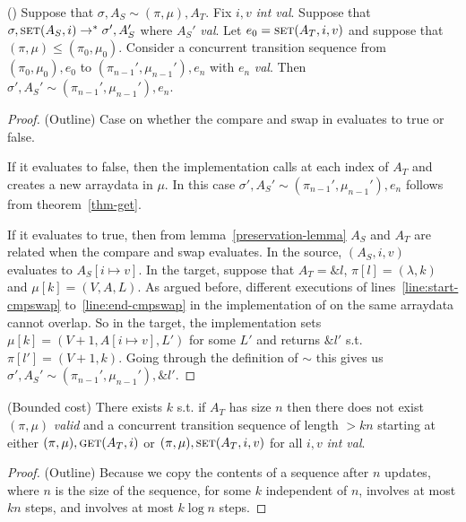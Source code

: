 \begin{theorem}
(\set{}) Suppose that $\sigma, A_S \sim (\pi,\mu), A_T$. Fix $i, v$ \emph{int val}. Suppose that $\sigma, \text{{\sc set}}{}(A_S, i) \to^* \sigma', A_S'$ where $A_S'$ \emph{val}. Let $e_0 = \text{{\sc set}}{}(A_T, i, v)$ and suppose that $(\pi, \mu) \leq (\pi_0, \mu_0)$. Consider a concurrent transition sequence from $(\pi_0, \mu_0), e_0$ to $(\pi_{n-1}', \mu_{n-1}'), e_n$ with $e_n$ \emph{val}. Then $\sigma', A_S' \sim (\pi_{n-1}', \mu_{n-1}'), e_n$.
\end{theorem}

\begin{proof}
(Outline) Case on whether the compare and swap in \set{} evaluates to true or false.

If it evaluates to false, then the implementation calls \get{} at each index of $A_T$ and creates a new arraydata in $\mu$. In this case $\sigma', A_S' \sim (\pi_{n-1}', \mu_{n-1}'), e_n$ follows from theorem~\ref{thm-get}.

If it evaluates to true, then from lemma~\ref{preservation-lemma} $A_S$ and $A_T$ are related when the compare and swap evaluates. In the source, \set{}$(A_S, i, v)$ evaluates to $A_S[i \mapsto v]$. In the target, suppose that $A_T = \&l$, $\pi[l] = (\lambda, k)$ and $\mu[k] = (V, A, L)$. As argued before, different executions of lines~\ref{line:start-cmpswap} to~\ref{line:end-cmpswap} in the implementation of \set{} on the same arraydata cannot overlap. So in the target, the implementation sets $\mu[k] = (V+1,A[i \mapsto v], L')$ for some $L'$ and returns $\&l'$ s.t. $\pi[l'] = (V+1, k)$. Going through the definition of $\sim$ this gives us $\sigma', A_S' \sim (\pi_{n-1}', \mu_{n-1}'), \&l'$.

\end{proof}

\begin{theorem}
(Bounded cost) There exists $k$ s.t. if $A_T$ has size $n$ then there does not exist $(\pi, \mu)$ \emph{valid} and a concurrent transition sequence of length $> kn$ starting at either $(\pi, \mu), \text{{\sc get}}{}(A_T, i)$ or $(\pi, \mu), \text{{\sc set}}{}(A_T, i, v)$ for all $i, v$ \emph{int val}.
\end{theorem}

\begin{proof}
(Outline) Because we copy the contents of a sequence after $n$ updates, where $n$ is the size of the sequence, for some $k$ independent of $n$, \set{} involves at most $kn$ steps, and \get{} involves at most $k\log{n}$ steps.
\end{proof}


